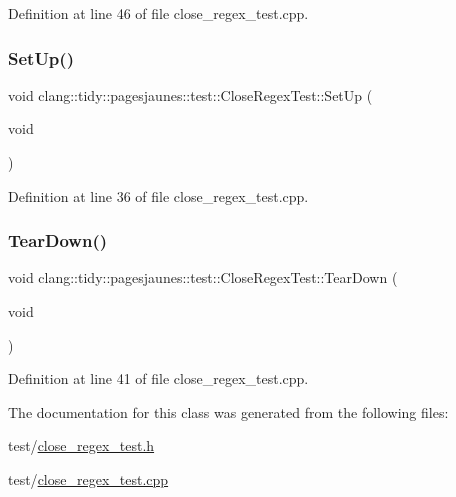 Definition at line 46 of file close\+\_\+regex\+\_\+test.\+cpp.

\mbox{\label{classclang_1_1tidy_1_1pagesjaunes_1_1test_1_1_close_regex_test_ae8c7f5fef7ce41611e43fab8e337f119}} 
\subsubsection{\texorpdfstring{Set\+Up()}{SetUp()}}
{\footnotesize\ttfamily void clang\+::tidy\+::pagesjaunes\+::test\+::\+Close\+Regex\+Test\+::\+Set\+Up (\begin{DoxyParamCaption}\item[{void}]{ }\end{DoxyParamCaption})\hspace{0.3cm}{\ttfamily [virtual]}}



Definition at line 36 of file close\+\_\+regex\+\_\+test.\+cpp.

\mbox{\label{classclang_1_1tidy_1_1pagesjaunes_1_1test_1_1_close_regex_test_a9544a575d6ad828b445aea37abefcbbd}} 
\subsubsection{\texorpdfstring{Tear\+Down()}{TearDown()}}
{\footnotesize\ttfamily void clang\+::tidy\+::pagesjaunes\+::test\+::\+Close\+Regex\+Test\+::\+Tear\+Down (\begin{DoxyParamCaption}\item[{void}]{ }\end{DoxyParamCaption})\hspace{0.3cm}{\ttfamily [virtual]}}



Definition at line 41 of file close\+\_\+regex\+\_\+test.\+cpp.



The documentation for this class was generated from the following files\+:\begin{DoxyCompactItemize}
\item 
test/\hyperlink{close__regex__test_8h}{close\+\_\+regex\+\_\+test.\+h}\item 
test/\hyperlink{close__regex__test_8cpp}{close\+\_\+regex\+\_\+test.\+cpp}\end{DoxyCompactItemize}
